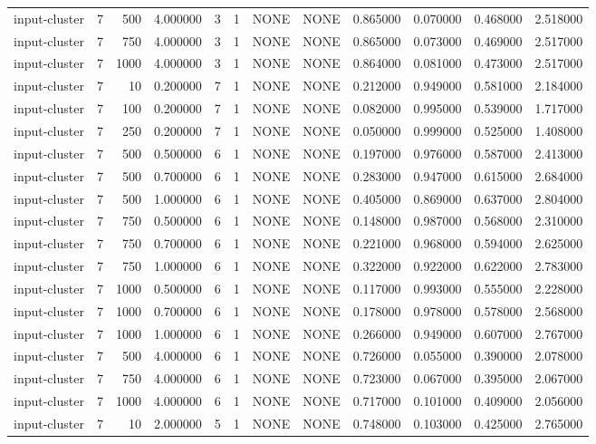 \begin{tabular}{lrrrllllrrrr}
input-cluster & 7 & 500 & 4.000000 & 3 & 1 & NONE & NONE & 0.865000 & 0.070000 & 0.468000 & 2.518000 \\
input-cluster & 7 & 750 & 4.000000 & 3 & 1 & NONE & NONE & 0.865000 & 0.073000 & 0.469000 & 2.517000 \\
input-cluster & 7 & 1000 & 4.000000 & 3 & 1 & NONE & NONE & 0.864000 & 0.081000 & 0.473000 & 2.517000 \\
input-cluster & 7 & 10 & 0.200000 & 7 & 1 & NONE & NONE & 0.212000 & 0.949000 & 0.581000 & 2.184000 \\
input-cluster & 7 & 100 & 0.200000 & 7 & 1 & NONE & NONE & 0.082000 & 0.995000 & 0.539000 & 1.717000 \\
input-cluster & 7 & 250 & 0.200000 & 7 & 1 & NONE & NONE & 0.050000 & 0.999000 & 0.525000 & 1.408000 \\
input-cluster & 7 & 500 & 0.500000 & 6 & 1 & NONE & NONE & 0.197000 & 0.976000 & 0.587000 & 2.413000 \\
input-cluster & 7 & 500 & 0.700000 & 6 & 1 & NONE & NONE & 0.283000 & 0.947000 & 0.615000 & 2.684000 \\
input-cluster & 7 & 500 & 1.000000 & 6 & 1 & NONE & NONE & 0.405000 & 0.869000 & 0.637000 & 2.804000 \\
input-cluster & 7 & 750 & 0.500000 & 6 & 1 & NONE & NONE & 0.148000 & 0.987000 & 0.568000 & 2.310000 \\
input-cluster & 7 & 750 & 0.700000 & 6 & 1 & NONE & NONE & 0.221000 & 0.968000 & 0.594000 & 2.625000 \\
input-cluster & 7 & 750 & 1.000000 & 6 & 1 & NONE & NONE & 0.322000 & 0.922000 & 0.622000 & 2.783000 \\
input-cluster & 7 & 1000 & 0.500000 & 6 & 1 & NONE & NONE & 0.117000 & 0.993000 & 0.555000 & 2.228000 \\
input-cluster & 7 & 1000 & 0.700000 & 6 & 1 & NONE & NONE & 0.178000 & 0.978000 & 0.578000 & 2.568000 \\
input-cluster & 7 & 1000 & 1.000000 & 6 & 1 & NONE & NONE & 0.266000 & 0.949000 & 0.607000 & 2.767000 \\
input-cluster & 7 & 500 & 4.000000 & 6 & 1 & NONE & NONE & 0.726000 & 0.055000 & 0.390000 & 2.078000 \\
input-cluster & 7 & 750 & 4.000000 & 6 & 1 & NONE & NONE & 0.723000 & 0.067000 & 0.395000 & 2.067000 \\
input-cluster & 7 & 1000 & 4.000000 & 6 & 1 & NONE & NONE & 0.717000 & 0.101000 & 0.409000 & 2.056000 \\
input-cluster & 7 & 10 & 2.000000 & 5 & 1 & NONE & NONE & 0.748000 & 0.103000 & 0.425000 & 2.765000 \\

\end{tabular}
